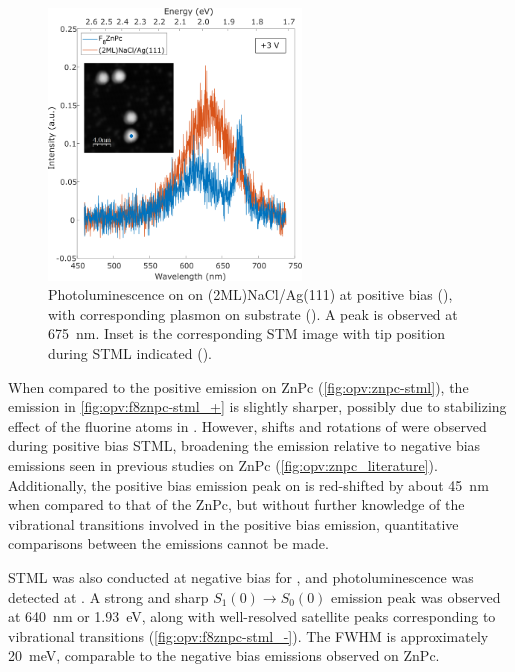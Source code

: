\begin{figure} [H]
    \centering
        \includegraphics[width=0.6\textwidth]{pictures/f8znpc_+ve_emission_inset.png}
    \caption{Photoluminescence on  on (2ML)NaCl/Ag(111) at positive bias (), with corresponding plasmon on substrate (). A peak is observed at \SI{675}{nm}. Inset is the corresponding STM image with tip position during STML indicated (). }
    \label{fig:opv:f8znpc-stml_+}
\end{figure}

When compared to the positive emission on ZnPc (\autoref{fig:opv:znpc-stml}), the emission in \autoref{fig:opv:f8znpc-stml_+} is slightly sharper, possibly due to stabilizing effect of the fluorine atoms in . However, shifts and rotations of  were observed during positive bias \ac{STML}, broadening the emission relative to negative bias emissions seen in previous studies on ZnPc (\autoref{fig:opv:znpc_literature}). Additionally, the positive bias emission peak on  is red-shifted by about \SI{45}{nm} when compared to that of the ZnPc, but without further knowledge of the vibrational transitions involved in the positive bias emission, quantitative comparisons between the emissions cannot be made.

\ac{STML} was also conducted at negative bias for , and photoluminescence was detected at . A strong and sharp $S_1(0) \rightarrow S_0(0)$ emission peak was observed at \SI{640}{nm} or \SI{1.93}{eV}, along with well-resolved satellite peaks corresponding to vibrational transitions (\autoref{fig:opv:f8znpc-stml_-}). The \ac{FWHM} is approximately \SI{20}{meV}, comparable to the negative bias emissions observed on ZnPc. 


